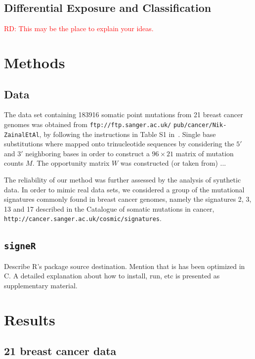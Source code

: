 \documentclass{bioinfo}
\newcommand{\CC}{C\nolinebreak\hspace{-.05em}\raisebox{.4ex}{\tiny\bf
    +}\nolinebreak\hspace{-.10em}\raisebox{.4ex}{\tiny\bf +}}
\begin{document}
\subsection{Differential Exposure and Classification}
\textcolor{red}{RD: This may be the place to explain your 
ideas.}


\section{Methods}
\subsection{Data} The data set containing 183916 somatic point
mutations from 21 breast cancer genomes was obtained from
\verb+ftp://ftp.sanger.ac.uk/+ \verb+pub/cancer/Nik-ZainalEtAl+, by
following the instructions in Table S1 in~\cite{NCell}. Single base 
substitutions where mapped onto trinucleotide sequences by considering
the $5'$ and $3'$ neighboring bases in order to construct a $96\times
21$ matrix of mutation counts $M$. 
The opportunity matrix $W$ was constructed (or taken from) ...


The reliability of our method was further assessed by the
analysis of synthetic data. In order to mimic real data sets, we
considered a group of the mutational signatures commonly found in
breast cancer genomes, namely the signatures 2, 3, 13 and 17 described 
in the Catalogue  of somatic  mutations in cancer, \verb~http://cancer.sanger.ac.uk/cosmic/signatures~.




\subsection{\texttt{signeR}} Describe R's package
source destination. Mention that is has been optimized in
\CC. A detailed explanation about how to install, run, etc is
presented as supplementary material.

\section{Results}
\subsection{21 breast cancer data}
\end{document}
